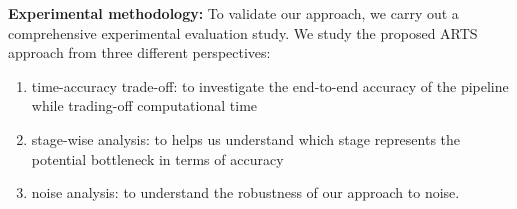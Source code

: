 
\textbf{Experimental methodology:}
To validate our approach, we carry out a comprehensive experimental evaluation study. We study the proposed ARTS approach from three different perspectives: 

\begin{enumerate}
\item time-accuracy trade-off: to investigate the end-to-end accuracy of the pipeline while trading-off computational time
\item stage-wise analysis: to helps us understand which stage represents the potential bottleneck in terms of accuracy
\item noise analysis: to understand the robustness of our approach to noise.
\end{enumerate}

\vspace{5pt}
